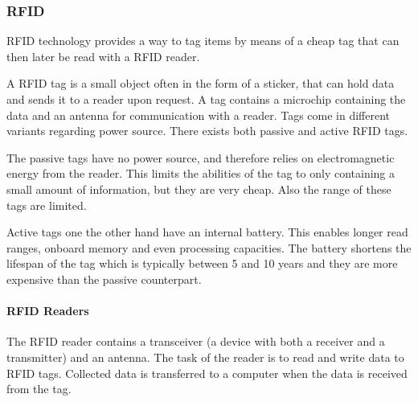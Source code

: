 \subsubsection{RFID}
RFID technology provides a way to tag items by means of a cheap tag that can then later be read with a RFID reader.

A RFID tag is a small object often in the form of a sticker, that can hold data and sends it to a reader upon request.
A tag contains a microchip containing the data and an antenna for communication with a reader.
Tags come in different variants regarding power source.
There exists both passive and active RFID tags.\cite{rfidreview}

The passive tags have no power source, and therefore relies on electromagnetic energy from the reader.
This limits the abilities of the tag to only containing a small amount of information, but they are very cheap.
Also the range of these tags are limited. \cite{rfidreview}

Active tags one the other hand have an internal battery.
This enables longer read ranges, onboard memory and even processing capacities.
The battery shortens the lifespan of the tag which is typically between 5 and 10 years and they are more expensive than the passive counterpart. \cite{rfidreview}

\paragraph{RFID Readers}
The RFID reader contains a transceiver (a device with both a receiver and a transmitter) and an antenna.
The task of the reader is to read and write data to RFID tags.
Collected data is transferred to a computer when the data is received from the tag.\cite{rfidreview}